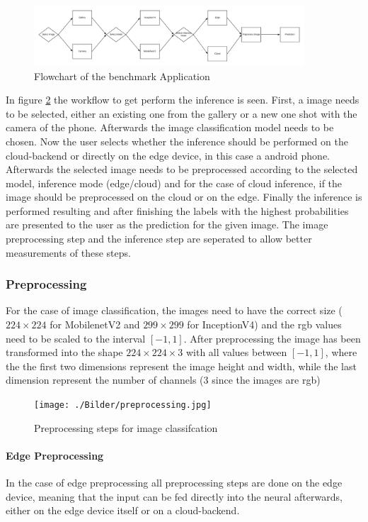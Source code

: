 \begin{figure}[H]
\centering
\includegraphics[width=0.9\textwidth]{./Bilder/FlowChart_App.png}
\caption{Flowchart of the benchmark Application}
\label{fig:app}
\end{figure}
In figure \ref{fig:app} the workflow to get perform the inference is seen. First, a image needs to be selected, either an existing one from the gallery or a new one shot with the camera of the phone. Afterwards the image classification model needs to be chosen. Now the user selects whether the inference should be performed on the cloud-backend or directly on the edge device, in this case a android phone. Afterwards the selected image needs to be preprocessed according to the selected model, inference mode (edge/cloud) and for the case of cloud inference, if the image should be preprocessed on the cloud or on the edge. Finally the inference is performed resulting and after finishing the labels with the highest probabilities are presented to the user as the prediction for the given image. The image preprocessing step and the inference step are seperated to allow better measurements of these steps.
\subsubsection{Preprocessing}
For the case of image classification, the images need to have the correct size ($224\times224$ for MobilenetV2 and $299\times299$ for InceptionV4) and the rgb values need to be scaled to the interval $[-1,1]$. After preprocessing the image has been transformed into the shape $224\times224\times3$ with all values between $[-1,1]$, where the the first two dimensions represent the image height and width, while the last dimension represent the number of channels (3 since the images are rgb)
\begin{figure}[H]
\centering
\texttt{[image: ./Bilder/preprocessing.jpg]}
\caption{Preprocessing steps for image classifcation}
\label{fig:app}
\end{figure}
\paragraph{Edge Preprocessing}
In the case of edge preprocessing all preprocessing steps are done on the edge device, meaning that the input can be fed directly into the neural afterwards, either on the edge device itself or on a cloud-backend.
